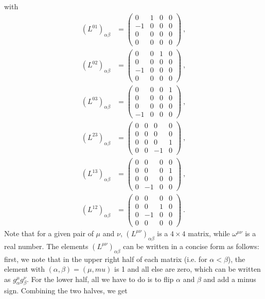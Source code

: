 \documentclass[12pt,a4paper]{report}
\begin{document}
with
\begin{align*}
   (L^{01})_{\alpha\beta}&=\begin{pmatrix}
    0&1&0&0\\
    -1&0&0&0\\
    0&0&0&0\\
    0&0&0&0
\end{pmatrix}~,\\
(L^{02})_{\alpha\beta}&=\begin{pmatrix}
    0&0&1&0\\
    0&0&0&0\\
    -1&0&0&0\\
    0&0&0&0
\end{pmatrix}~,\\
(L^{03})_{\alpha\beta}&=\begin{pmatrix}
    0&0&0&1\\
    0&0&0&0\\
    0&0&0&0\\
    -1&0&0&0
\end{pmatrix}~,\\
(L^{23})_{\alpha\beta}&=\begin{pmatrix}
    0&0&0&0\\
    0&0&0&0\\
    0&0&0&1\\
    0&0&-1&0
\end{pmatrix}~,
\end{align*}
\begin{align}
(L^{13})_{\alpha\beta}&=\begin{pmatrix}
    0&0&0&0\\
    0&0&0&1\\
    0&0&0&0\\
    0&-1&0&0
\end{pmatrix}~,\nonumber\\
(L^{12})_{\alpha\beta}&=\begin{pmatrix}
    0&0&0&0\\
    0&0&1&0\\
    0&-1&0&0\\
    0&0&0&0
\end{pmatrix}~.\label{1.85}
\end{align}
Note that for a given pair of $\mu$ and $\nu$, $(L^{\mu\nu})_{\alpha\beta}$ is a $4\times4$ matrix, while $\omega^{\mu\nu}$ is a real number. The elements $(L^{\mu\nu})_{\alpha\beta}$ can be written in a concise form as follows: first, we note that in the upper right half of each matrix (i.e. for $\alpha < \beta$), the element with $(\alpha, \beta) = (\mu, mu)$ is 1 and all else are zero, which can be written as $g^\mu_\alpha g^\nu_\beta$. For the lower half, all we have to do is to flip $\alpha$ and $\beta$ and add a minus sign. Combining the two halves, we get
\end{document}
